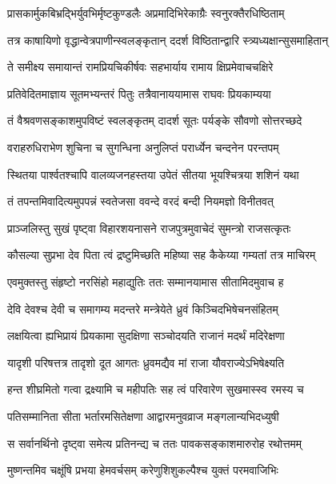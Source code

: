 \twolineshloka
{प्रासकार्मुकबिभ्रद्भिर्युवभिर्मृष्टकुण्डलैः}
{अप्रमादिभिरेकाग्रैः स्वनुरक्तैरधिष्ठिताम्} %

\twolineshloka
{तत्र काषायिणो वृद्धान्वेत्रपाणीन्स्वलङ्कृतान्}
{ददर्श विष्ठितान्द्वारि स्त्र्यध्यक्षान्सुसमाहितान्} %

\twolineshloka
{ते समीक्ष्य समायान्तं रामप्रियचिकीर्षवः}
{सहभार्याय रामाय क्षिप्रमेवाचचक्षिरे} %

\twolineshloka
{प्रतिवेदितमाज्ञाय सूतमभ्यन्तरं पितुः}
{तत्रैवानाययामास राघवः प्रियकाम्यया} %

\twolineshloka
{तं वैश्रवणसङ्काशमुपविष्टं स्वलङ्कृतम्}
{दादर्श सूतः पर्यङ्के सौवणो सोत्तरच्छदे} %

\twolineshloka
{वराहरुधिराभेण शुचिना च सुगन्धिना}
{अनुलिप्तं परार्ध्येन चन्दनेन परन्तपम्} %

\twolineshloka
{स्थितया पार्श्वतश्चापि वालव्यजनहस्तया}
{उपेतं सीतया भूयश्चित्रया शशिनं यथा} %

\twolineshloka
{तं तपन्तमिवादित्यमुपपन्नं स्वतेजसा}
{ववन्दे वरदं बन्दी नियमज्ञो विनीतवत्} %

\twolineshloka
{प्राञ्जलिस्तु सुखं पृष्ट्वा विहारशयनासने}
{राजपुत्रमुवाचेदं सुमन्त्रो राजसत्कृतः} %

\twolineshloka
{कौसल्या सुप्रभा देव पिता त्वं द्रष्टुमिच्छति}
{महिष्या सह कैकेय्या गम्यतां तत्र माचिरम्} %

\twolineshloka
{एवमुक्तस्तु संहृष्टो नरसिंहो महाद्युतिः}
{ततः सम्मानयामास सीतामिदमुवाच ह} %

\twolineshloka
{देवि देवश्च देवी च समागम्य मदन्तरे}
{मन्त्रेयेते ध्रुवं किञ्चिदभिषेचनसंहितम्} %

\twolineshloka
{लक्षयित्वा ह्यभिप्रायं प्रियकामा सुदक्षिणा}
{सञ्चोदयति राजानं मदर्थं मदिरेक्षणा} %

\twolineshloka
{यादृशी परिषत्तत्र तादृशो दूत आगतः}
{ध्रुवमद्यैव मां राजा यौवराज्येऽभिषेक्ष्यति} %

\twolineshloka
{हन्त शीघ्रमितो गत्वा द्रक्ष्यामि च महीपतिः}
{सह त्वं परिवारेण सुखमास्स्व रमस्य च} %

\twolineshloka
{पतिसम्मानिता सीता भर्तारमसितेक्षणा}
{आद्वारमनुवव्राज मङ्गलान्यभिदध्युषी} %

\twolineshloka
{स सर्वानर्थिनो दृष्ट्वा समेत्य प्रतिनन्द्य च}
{ततः पावकसङ्काशमारुरोह रथोत्तमम्} %

\twolineshloka
{मुष्णन्तमिव चक्षूंषि प्रभया हेमवर्चसम्}
{करेणुशिशुकल्पैश्च युक्तं परमवाजिभिः} %

